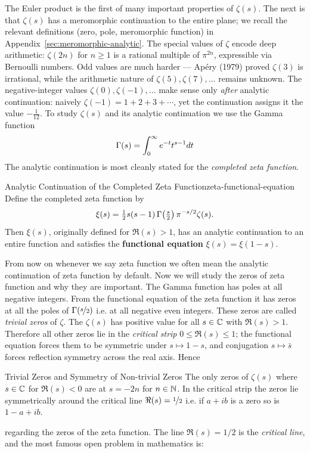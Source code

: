 The Euler product is the first of many important properties of $\zeta(s)$. The next is that $\zeta(s)$ has a meromorphic continuation to the entire plane; we recall the relevant definitions (zero, pole, meromorphic function) in Appendix~\ref{sec:meromorphic-analytic}. The special values of $\zeta$ encode deep arithmetic: $\zeta(2n)$ for $n \geq 1$ is a rational multiple of $\pi^{2n}$, expressible via Bernoulli numbers. Odd values are much harder --- Ap\'ery (1979) proved $\zeta(3)$ is irrational, while the arithmetic nature of $\zeta(5), \zeta(7), \ldots$ remains unknown. The negative-integer values $\zeta(0), \zeta(-1), \ldots$ make sense only \emph{after} analytic continuation: naively $\zeta(-1) = 1 + 2 + 3 + \cdots$, yet the continuation assigns it the value $-\tfrac{1}{12}$. To study $\zeta(s)$ and its analytic continuation we use the Gamma function $$\Gamma(s)=\int_0^{\infty}e^{-t}t^{s-1}dt$$The analytic continuation is most cleanly stated for the \emph{completed zeta function}.

\begin{Theorem}{Analytic Continuation of the Completed Zeta Function}{zeta-functional-equation}%
  Define the completed zeta function by
  $$\xi(s) = \tfrac{1}{2}s(s-1)\,\Gamma\!\left(\tfrac{s}{2}\right)\pi^{-s/2}\zeta(s).$$
  Then $\xi(s)$, originally defined for $\Re(s) > 1$, has an analytic continuation to an entire function and satisfies the \textbf{functional equation} $\xi(s) = \xi(1-s)$.
\end{Theorem}

From now on whenever we say zeta function we often mean the analytic continuation of zeta function by default. Now we will study the zeros of zeta function and why they are important. The Gamma function has poles at all negative integers. From the functional equation of the zeta function it has zeros at all the poles of $\Gamma(\nicefrac{s}2)$ i.e. at all negative even integers. These zeros are called \emph{trivial zeros} of $\zeta$. The $\zeta(s)$ has positive value for all $s\in\mathbb{C}$ with $\Re(s)>1$. Therefore all other zeros lie in the \emph{critical strip} $0\leq\Re(s)\leq 1$; the functional equation forces them to be symmetric under $s\mapsto 1-s$, and conjugation $s\mapsto\bar s$ forces reflection symmetry across the real axis. Hence 

\begin{Theorem}{Trivial Zeros and Symmetry of Non-trivial Zeros}{}
  The only zeros of $\zeta(s)$ where $s\in\mathbb{C}$ for $\Re(s)<0$ are at $s=-2n$ for $n\in\mathbb{N}$. In the critical strip the zeros lie symmetrically around the critical line $\Re(s)=\nicefrac12$ i.e. if $a+ib$ is a zero so is $1-a+ib$.
\end{Theorem}
regarding the zeros of the zeta function. The line $\Re(s)=1/2$ is the \emph{critical line}, and the most famous open problem in mathematics is:

